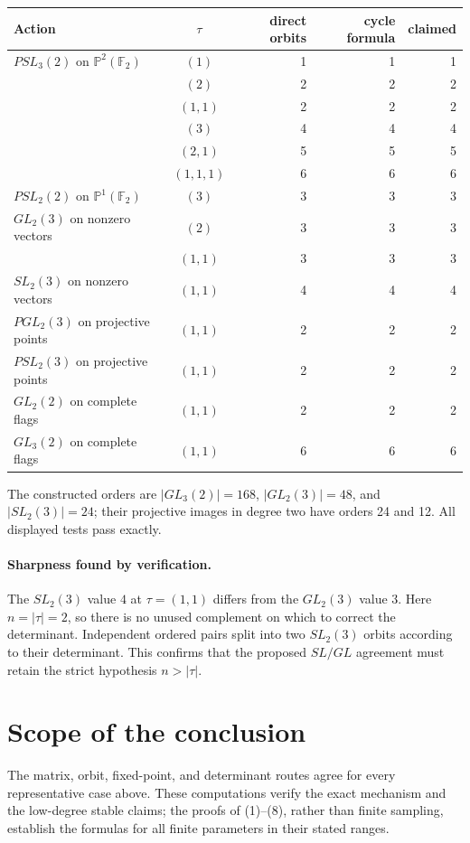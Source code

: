 \documentclass[10pt]{article}
\newcommand{\F}{\mathbb F}
\begin{document}
\begin{center}
\small
\begin{tabular}{@{}lcrrr@{}}
\toprule
Action & $\tau$ & direct orbits & cycle formula & claimed\\
\midrule
$PSL_3(2)$ on $\mathbb P^2(\F_2)$ & $(1)$ & 1&1&1\\
 & $(2)$ &2&2&2\\
 & $(1,1)$ &2&2&2\\
 & $(3)$ &4&4&4\\
 & $(2,1)$ &5&5&5\\
 & $(1,1,1)$ &6&6&6\\
$PSL_2(2)$ on $\mathbb P^1(\F_2)$ & $(3)$ &3&3&3\\
$GL_2(3)$ on nonzero vectors & $(2)$ &3&3&3\\
 & $(1,1)$ &3&3&3\\
$SL_2(3)$ on nonzero vectors & $(1,1)$ &4&4&4\\
$PGL_2(3)$ on projective points & $(1,1)$ &2&2&2\\
$PSL_2(3)$ on projective points & $(1,1)$ &2&2&2\\
$GL_2(2)$ on complete flags & $(1,1)$ &2&2&2\\
$GL_3(2)$ on complete flags & $(1,1)$ &6&6&6\\
\bottomrule
\end{tabular}
\end{center}

The constructed orders are $|GL_3(2)|=168$, $|GL_2(3)|=48$, and
$|SL_2(3)|=24$; their projective images in degree two have orders 24 and 12.
All displayed tests pass exactly.

\paragraph{Sharpness found by verification.}
The $SL_2(3)$ value $4$ at $\tau=(1,1)$ differs from the $GL_2(3)$ value
$3$.  Here $n=|\tau|=2$, so there is no unused complement on which to correct
the determinant.  Independent ordered pairs split into two $SL_2(3)$ orbits
according to their determinant.  This confirms that the proposed $SL/GL$
agreement must retain the strict hypothesis $n>|\tau|$.

\section{Scope of the conclusion}
The matrix, orbit, fixed-point, and determinant routes agree for every
representative case above.  These computations verify the exact mechanism and
the low-degree stable claims; the proofs of (1)--(8), rather than finite
sampling, establish the formulas for all finite parameters in their stated
ranges.
\end{document}
